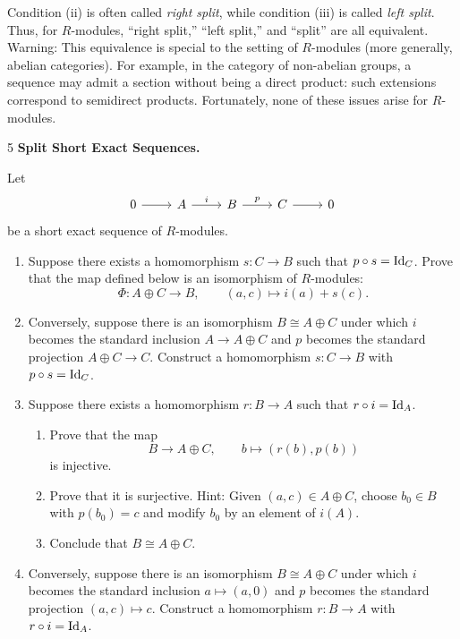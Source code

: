 \documentclass[Notebook.tex]{subfiles}
\begin{document}
Condition (ii) is often called \emph{right split}, while condition (iii) is called \emph{left split}. Thus, for $R$-modules, ``right split,'' ``left split,'' and ``split'' are all equivalent. Warning: This equivalence is special to the setting of $R$-modules (more generally, abelian categories). For example, in the category of non-abelian groups, a sequence may admit a section without being a direct product: such extensions correspond to semidirect products. Fortunately, none of these issues arise for $R$-modules.

\hrulefill

\begin{problem}{5} \textbf{Split Short Exact Sequences.} 
    
    Let
    \[
    \begin{tikzcd}
    0 \ar[r] & A \ar[r, "i"] & B \ar[r, "p"] & C \ar[r] & 0
    \end{tikzcd}
    \]
    be a short exact sequence of $R$-modules.
    \begin{enumerate}
        \item Suppose there exists a homomorphism $s:C\to B$ such that $p\circ s=\operatorname{Id}_C$. Prove that the map defined below is an isomorphism of $R$-modules:
        \[
        \Phi:A\oplus C\longrightarrow B,
        \qquad
        (a,c)\longmapsto i(a)+s(c).
        \]
        \item Conversely, suppose there is an isomorphism $B\cong A\oplus C$ under which $i$ becomes the standard inclusion $A\to A\oplus C$ and $p$ becomes the standard projection $A\oplus C\to C$. Construct a homomorphism $s:C\to B$ with $p\circ s=\operatorname{Id}_C$.
        \item Suppose there exists a homomorphism $r:B\to A$ such that $r\circ i=\operatorname{Id}_A$.
        \begin{enumerate}
            \item Prove that the map
            \[
            B\longrightarrow A\oplus C,\qquad b\longmapsto (r(b),p(b))
            \]
            is injective.
            \item Prove that it is surjective. Hint: Given $(a,c)\in A\oplus C$, choose $b_0\in B$ with $p(b_0)=c$ and modify $b_0$ by an element of $i(A)$.
            \item Conclude that $B\cong A\oplus C$.
        \end{enumerate}
        \item Conversely, suppose there is an isomorphism $B\cong A\oplus C$ under which $i$ becomes the standard inclusion $a\mapsto(a,0)$ and $p$ becomes the standard projection $(a,c)\mapsto c$. Construct a homomorphism $r:B\to A$ with $r\circ i=\operatorname{Id}_A$.
    \end{enumerate}    
\end{problem}
\end{document}
